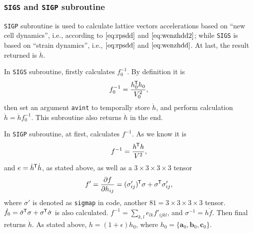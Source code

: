
\subsubsection{\texttt{SIGS} and \texttt{SIGP} subroutine}
\label{sssec:sigs&p}

\texttt{SIGP} subroutine is used to calculate lattice vectors accelerations
based on ``new cell dynamics'', i.e., according to $\eqref{eq:rpsdd}$ and
$\eqref{eq:wenzhdd2}$; while \texttt{SIGS} is based on ``strain dynamics'',
i.e., $\eqref{eq:rpsdd}$ and $\eqref{eq:wenzhdd}$.
At last, the result returned is $\ddot{h}$.

In \texttt{SIGS} subroutine,
firstly calculates $f_0^{-1}$. By definition it is
\begin{equation}
	f_0^{-1} = \frac{ h_0 ^{\mkern-1.5mu\mathsf{T}} h_0}{ V_0^2 },
\end{equation}
then set an argument \texttt{avint} to temporally store $\ddot{h}$,
and perform calculation $\ddot{h} = \ddot{h} f_0^{-1}$.
This subroutine also returns $\ddot{h}$ in the end.

In \texttt{SIGP} subroutine,
at first, calculates $f^{-1}$. As we know it is
\begin{equation}
	f^{-1} = \frac{ h ^{\mkern-1.5mu\mathsf{T}} h }{ V^2 },
\end{equation}
and $e = \dot{ h }^{\mkern-1.5mu\mathsf{T}} \dot{ h }$, as stated above, as well as
a $3\times 3 \times 3 \times 3$ tensor
\begin{equation}
	f ' = \frac{ \partial f }{ \partial h_{ij} } = (\sigma'_{ij})^{\mkern-1.5mu\mathsf{T}} \sigma
	+ \sigma ^{\mkern-1.5mu\mathsf{T}} \sigma'_{ij},
\end{equation}
where $\sigma'$ is denoted as \texttt{sigmap} in code, another $81 = 3\times 3
\times 3 \times 3$ tensor.
$\dot{f}_0 = \dot{ \sigma } ^{\mkern-1.5mu\mathsf{T}} \sigma + \sigma ^{\mkern-1.5mu\mathsf{T}} \dot{ \sigma }$ is
also calculated.
$f^{-1} = \sum_{k, l} e_{lk} f'_{ijkl}$, and $\sigma^{-1} = h \dot{ f }$.
Then final returns $\ddot{h}$. As stated above, $h = (1 + \epsilon) h_0$,
where $h_0 = \{ \bm{a}_0, \bm{b}_0, \bm{c}_0 \}$.
